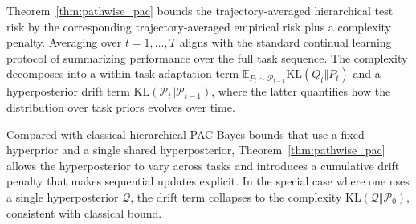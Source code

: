 \documentclass{article}
\theoremstyle{plain}
\theoremstyle{definition}
\theoremstyle{remark}
\begin{document}
Theorem~\ref{thm:pathwise_pac} bounds the trajectory-averaged hierarchical test risk by the corresponding trajectory-averaged empirical risk plus a complexity penalty.
Averaging over $t=1,\dots,T$ aligns with the standard continual learning protocol of summarizing performance over the full task sequence.
The complexity decomposes into a within task adaptation term $\mathbb E_{P_t\sim\mathcal P_{t-1}}\mathrm{KL}(Q_t\Vert P_t)$ and a hyperposterior drift term $\mathrm{KL}(\mathcal P_t\Vert\mathcal P_{t-1})$, where the latter quantifies how the distribution over task priors evolves over time.

Compared with classical hierarchical PAC-Bayes bounds that use a fixed hyperprior and a single shared hyperposterior, Theorem~\ref{thm:pathwise_pac} allows the hyperposterior to vary across tasks and introduces a cumulative drift penalty that makes sequential updates explicit.
In the special case where one uses a single hyperposterior $\mathcal Q$, the drift term collapses to the complexity $\mathrm{KL}(\mathcal Q \Vert \mathcal P_0)$, consistent with classical bound. 
\end{document}
